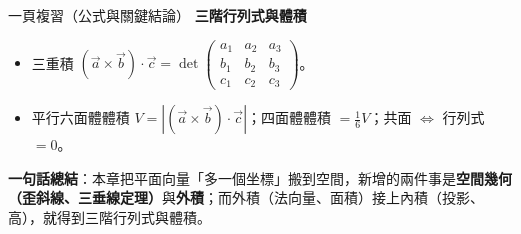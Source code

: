 \documentclass[11pt]{article}
\begin{document}
\begin{補充框}{一頁複習（公式與關鍵結論）}
\textbf{三階行列式與體積}
\begin{itemize}\setlength{\itemsep}{1pt}
\item 三重積 $(\vec a\times\vec b)\cdot\vec c=\det\begin{pmatrix}a_1&a_2&a_3\\ b_1&b_2&b_3\\ c_1&c_2&c_3\end{pmatrix}$。
\item 平行六面體體積 $V=|(\vec a\times\vec b)\cdot\vec c|$；四面體體積 $=\tfrac16V$；共面 $\iff$ 行列式 $=0$。
\end{itemize}

\textbf{一句話總結}：本章把平面向量「多一個坐標」搬到空間，新增的兩件事是\textbf{空間幾何（歪斜線、三垂線定理）}與\textbf{外積}；而外積（法向量、面積）接上內積（投影、高），就得到三階行列式與體積。
\end{補充框}
\end{document}
